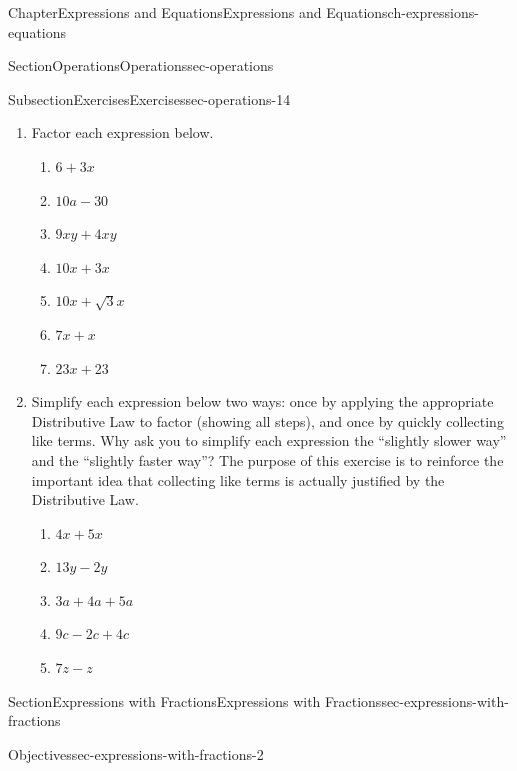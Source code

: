 \documentclass[twoside,11pt,]{book}
\numberwithin{equation}{chapter}
\begin{document}
\begin{chapterptx}{Chapter}{Expressions and Equations}{}{Expressions and Equations}{}{}{ch-expressions-equations}
\begin{sectionptx}{Section}{Operations}{}{Operations}{}{}{sec-operations}
\begin{subsectionptx}{Subsection}{Exercises}{}{Exercises}{}{}{sec-operations-14}
\begin{enumerate}
\begin{enumerate}
\item{}\(\displaystyle (p+q)(r+s)\)%
\item{}\(\displaystyle a(b+c+d)\)%
\item{}\(\displaystyle a \times a\)%
\item{}\(\displaystyle (x+5)(x+5)\)%
\end{enumerate}
%
\item{}Factor each expression below.%
\begin{enumerate}
\item{}\(\displaystyle 6 + 3x\)%
\item{}\(\displaystyle 10a - 30\)%
\item{}\(\displaystyle 9xy + 4xy\)%
\item{}\(\displaystyle 10x + 3x\)%
\item{}\(\displaystyle 10x + \sqrt{3}x\)%
\item{}\(\displaystyle 7x + x\)%
\item{}\(\displaystyle 23x + 23\)%
\end{enumerate}
%
\item{}Simplify each expression below two ways: once by applying the appropriate Distributive Law to factor (showing all steps), and once by quickly collecting like terms. Why ask you to simplify each expression the ``slightly slower way'' and the ``slightly faster way''? The purpose of this exercise is to reinforce the important idea that collecting like terms is actually justified by the Distributive Law.%
\begin{enumerate}
\item{}\(\displaystyle 4x + 5x\)%
\item{}\(\displaystyle 13y - 2y\)%
\item{}\(\displaystyle 3a + 4a + 5a\)%
\item{}\(\displaystyle 9c - 2c + 4c\)%
\item{}\(\displaystyle 7z - z\)%
\end{enumerate}
%
\end{enumerate}
%
\end{subsectionptx}
\end{sectionptx}
%
%
\typeout{************************************************}
\typeout{************************************************}
%
\begin{sectionptx}{Section}{Expressions with Fractions}{}{Expressions with Fractions}{}{}{sec-expressions-with-fractions}
\begin{objectives}{Objectives}{sec-expressions-with-fractions-2}

\end{objectives}
\end{sectionptx}
\end{chapterptx}
\end{document}
